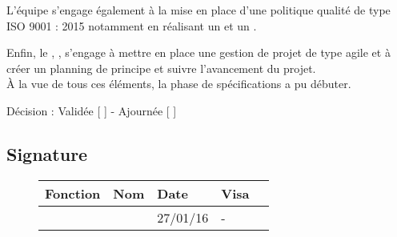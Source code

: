 \documentclass[asi, sansVersion]{picInsa}
\begin{document}
L'équipe \nomEquipe{} s'engage également à la mise en place d'une politique qualité de type ISO 9001 : 2015 notamment en réalisant un \PQ{} et un \PGC{}.

Enfin, le \CP{}, \Sergi{}, s'engage à mettre en place une gestion de projet de type agile et à créer un planning de principe et suivre l'avancement du projet. \\


À la vue de tous ces éléments, la phase de spécifications a pu débuter.

\begin{center}
Décision : Validée [ \checkmark{} ] - Ajournée [ ]
\end{center}

\subsection*{Signature}
\begin{figure}[H]
		\centering
		\begin{tabularx}{17cm}{|p{4cm}|X|X|X|X|}
		\hline
		\rowcolor[gray]{0.85} Fonction & Nom & Date & Visa \\
		\hline
		\CP{} & \Sergi{} & 27/01/16 & - \\
		\hline
		\end{tabularx}
\end{figure}
\end{document}
